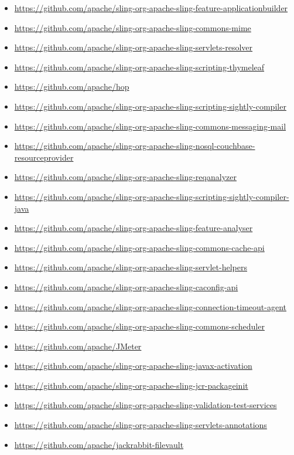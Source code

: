 \documentclass[sigconf]{acmart}
\begin{document}
\begin{itemize}
  \item \url{https://github.com/apache/sling-org-apache-sling-feature-applicationbuilder}
  \item \url{https://github.com/apache/sling-org-apache-sling-commons-mime}
  \item \url{https://github.com/apache/sling-org-apache-sling-servlets-resolver}
  \item \url{https://github.com/apache/sling-org-apache-sling-scripting-thymeleaf}
  \item \url{https://github.com/apache/hop}
  \item \url{https://github.com/apache/sling-org-apache-sling-scripting-sightly-compiler}
  \item \url{https://github.com/apache/sling-org-apache-sling-commons-messaging-mail}
  \item \url{https://github.com/apache/sling-org-apache-sling-nosql-couchbase-resourceprovider}
  \item \url{https://github.com/apache/sling-org-apache-sling-reqanalyzer}
  \item \url{https://github.com/apache/sling-org-apache-sling-scripting-sightly-compiler-java}
  \item \url{https://github.com/apache/sling-org-apache-sling-feature-analyser}
  \item \url{https://github.com/apache/sling-org-apache-sling-commons-cache-api}
  \item \url{https://github.com/apache/sling-org-apache-sling-servlet-helpers}
  \item \url{https://github.com/apache/sling-org-apache-sling-caconfig-api}
  \item \url{https://github.com/apache/sling-org-apache-sling-connection-timeout-agent}
  \item \url{https://github.com/apache/sling-org-apache-sling-commons-scheduler}
  \item \url{https://github.com/apache/JMeter}
  \item \url{https://github.com/apache/sling-org-apache-sling-javax-activation}
  \item \url{https://github.com/apache/sling-org-apache-sling-jcr-packageinit}
  \item \url{https://github.com/apache/sling-org-apache-sling-validation-test-services}
  \item \url{https://github.com/apache/sling-org-apache-sling-servlets-annotations}
  \item \url{https://github.com/apache/jackrabbit-filevault}

\end{itemize}
\end{document}
